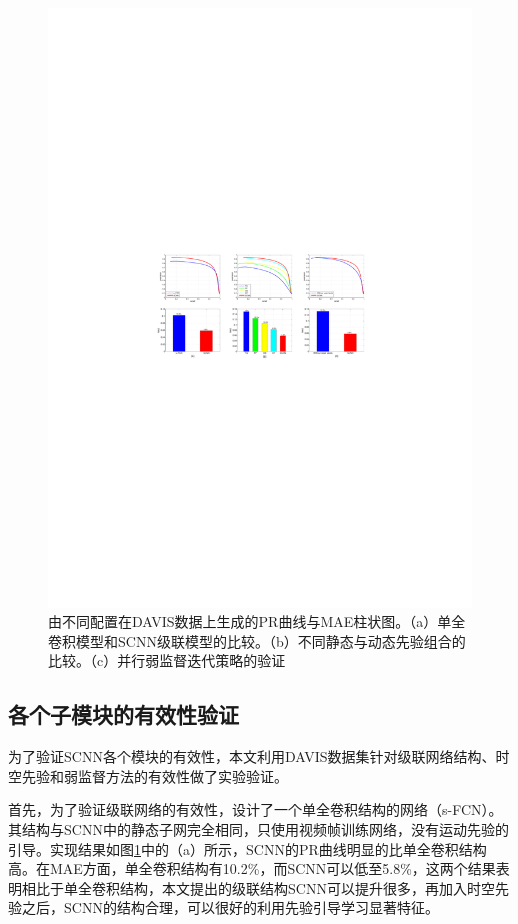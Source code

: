 \begin{figure}[tbp]
\center
\includegraphics[width=15cm]{figures/self_compare3}
\caption{由不同配置在DAVIS数据上生成的PR曲线与MAE柱状图。（a）单全卷积模型和SCNN级联模型的比较。（b）不同静态与动态先验组合的比较。（c）并行弱监督迭代策略的验证}
\label{figure6}
\end{figure}

\subsection{各个子模块的有效性验证}

为了验证SCNN各个模块的有效性，本文利用DAVIS数据集针对级联网络结构、时空先验和弱监督方法的有效性做了实验验证。

首先，为了验证级联网络的有效性，设计了一个单全卷积结构的网络（s-FCN）。其结构与SCNN中的静态子网完全相同，只使用视频帧训练网络，没有运动先验的引导。实现结果如图\ref{figure6}中的（a）所示，SCNN的PR曲线明显的比单全卷积结构高。在MAE方面，单全卷积结构有10.2\%，而SCNN可以低至5.8\%，这两个结果表明相比于单全卷积结构，本文提出的级联结构SCNN可以提升很多，再加入时空先验之后，SCNN的结构合理，可以很好的利用先验引导学习显著特征。

